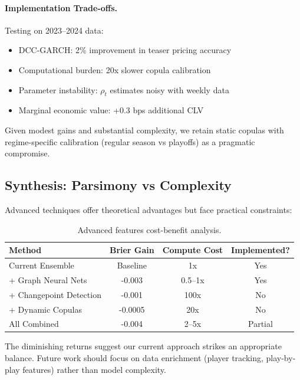 \paragraph{Implementation Trade-offs.}
Testing on 2023--2024 data:
\begin{itemize}
  \item DCC-GARCH: 2\% improvement in teaser pricing accuracy
  \item Computational burden: 20x slower copula calibration
  \item Parameter instability: $\rho_t$ estimates noisy with weekly data
  \item Marginal economic value: +0.3 bps additional CLV
\end{itemize}

Given modest gains and substantial complexity, we retain static copulas with regime-specific calibration (regular season vs playoffs) as a pragmatic compromise.

\subsection{Synthesis: Parsimony vs Complexity}

Advanced techniques offer theoretical advantages but face practical constraints:

\begin{table}[!ht]
  \centering
  \small
  \caption{Advanced features cost-benefit analysis.}
  \begin{tabular}{lccc}
    \toprule
    \textbf{Method}  & \textbf{Brier Gain}  & \textbf{Compute Cost}  & \textbf{Implemented?} \\
    \midrule
    Current Ensemble & Baseline & 1x & Yes \\
    + Graph Neural Nets & -0.003 & 0.5--1x\footnotemark & Yes \\
    + Changepoint Detection & -0.001 & 100x & No \\
    + Dynamic Copulas & -0.0005 & 20x & No \\
    All Combined & -0.004 & 2--5x & Partial \\
    \bottomrule
  \end{tabular}
\end{table}

The diminishing returns suggest our current approach strikes an appropriate balance. Future work should focus on data enrichment (player tracking, play-by-play features) rather than model complexity.

